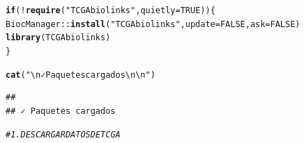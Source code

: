 \documentclass{article}\usepackage[]{graphicx}\usepackage[]{xcolor}
\makeatletter
\newcommand{\hlnum}[1]{\textcolor[rgb]{0.686,0.059,0.569}{#1}}%
\newcommand{\hlsng}[1]{\textcolor[rgb]{0.192,0.494,0.8}{#1}}%
\newcommand{\hlcom}[1]{\textcolor[rgb]{0.678,0.584,0.686}{\textit{#1}}}%
\newcommand{\hlopt}[1]{\textcolor[rgb]{0,0,0}{#1}}%
\newcommand{\hldef}[1]{\textcolor[rgb]{0.345,0.345,0.345}{#1}}%
\newcommand{\hlkwa}[1]{\textcolor[rgb]{0.161,0.373,0.58}{\textbf{#1}}}%
\newcommand{\hlkwc}[1]{\textcolor[rgb]{0.333,0.667,0.333}{#1}}%
\newcommand{\hlkwd}[1]{\textcolor[rgb]{0.737,0.353,0.396}{\textbf{#1}}}%
\newenvironment{kframe}{%
 \def\at@end@of@kframe{}%
 \ifinner\ifhmode%
  \def\at@end@of@kframe{\end{minipage}}%
  \begin{minipage}{\columnwidth}%
 \fi\fi%
 \def\FrameCommand##1{\hskip\@totalleftmargin \hskip-\fboxsep
 \colorbox{shadecolor}{##1}\hskip-\fboxsep
     \hskip-\linewidth \hskip-\@totalleftmargin \hskip\columnwidth}%
 \MakeFramed {\advance\hsize-\width
   \@totalleftmargin\z@ \linewidth\hsize
   \@setminipage}}%
 {\par\unskip\endMakeFramed%
 \at@end@of@kframe}
\newenvironment{knitrout}{}{} %
\makeatother
\begin{document}
\begin{knitrout}
\begin{kframe}
{\ttfamily\noindent\itshape\color{messagecolor}{\#\# The following objects are masked from 'package:matrixStats':\\\#\# \\\#\# \ \ \ \ anyMissing, rowMedians}}

{\ttfamily\noindent\color{warningcolor}{\#\# Warning: package 'GenomeInfoDb' was built under R version 4.5.2}}\begin{alltt}
\hlkwa{if}\hldef{(}\hlopt{!}\hlkwd{require}\hldef{(}\hlsng{"TCGAbiolinks"}\hldef{,} \hlkwc{quietly} \hldef{=} \hlnum{TRUE}\hldef{)) \{}
  \hldef{BiocManager}\hlopt{::}\hlkwd{install}\hldef{(}\hlsng{"TCGAbiolinks"}\hldef{,} \hlkwc{update} \hldef{=} \hlnum{FALSE}\hldef{,} \hlkwc{ask} \hldef{=} \hlnum{FALSE}\hldef{)}
  \hlkwd{library}\hldef{(TCGAbiolinks)}
\hldef{\}}

\hlkwd{cat}\hldef{(}\hlsng{"\textbackslash{}n✓ Paquetes cargados\textbackslash{}n\textbackslash{}n"}\hldef{)}
\end{alltt}
\begin{verbatim}
## 
## ✓ Paquetes cargados
\end{verbatim}
\end{kframe}
\end{knitrout}
\begin{knitrout}
\color{fgcolor}\begin{kframe}
\begin{alltt}
\hlcom{# 1. DESCARGAR DATOS DE TCGA}
\end{alltt}
\end{kframe}
\end{knitrout}
\end{document}
